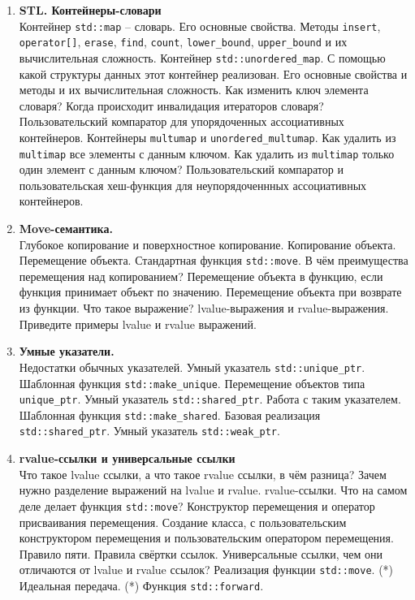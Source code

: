 \documentclass{article}
\begin{document}
\begin{enumerate}
\item \textbf{STL. Контейнеры-словари}\\
Контейнер \texttt{std::map} -- словарь. Его основные свойства. Методы \texttt{insert}, \texttt{operator[]}, \texttt{erase}, \texttt{find}, \texttt{count}, \texttt{lower\_bound}, \texttt{upper\_bound} и их вычислительная сложность. Контейнер \texttt{std::unordered\_map}. С помощью какой структуры данных этот контейнер реализован. Его основные свойства и методы и их вычислительная сложность. Как изменить ключ элемента словаря?  Когда происходит инвалидация итераторов словаря? Пользовательский компаратор для упорядоченных ассоциативных контейнеров. Контейнеры \texttt{multumap} и \texttt{unordered\_multumap}. Как удалить из \texttt{multimap} все элементы с данным ключом. Как удалить из \texttt{multimap} только один элемент с данным ключом? Пользовательский компаратор и пользовательская хеш-функция для неупорядоченнных ассоциативных контейнеров.




\item \textbf{Move-семантика.}\\
Глубокое копирование и поверхностное копирование. Копирование объекта. Перемещение объекта. Стандартная функция \texttt{std::move}. В чём преимущества перемещения над копированием? Перемещение объекта в функцию, если функция принимает объект по значению. Перемещение объекта при возврате из функции. Что такое выражение? lvalue-выражения и rvalue-выражения. Приведите примеры lvalue и rvalue выражений. 

\item \textbf{Умные указатели.}\\
Недостатки обычных указателей. Умный указатель \texttt{std::unique\_ptr}. Шаблонная функция \texttt{std::make\_unique}. Перемещение объектов типа \texttt{unique\_ptr}. Умный указатель \texttt{std::shared\_ptr}. Работа с таким указателем. Шаблонная функция \texttt{std::make\_shared}. Базовая реализация \texttt{std::shared\_ptr}. Умный указатель \texttt{std::weak\_ptr}.


\item \textbf{rvalue-ссылки и универсальные ссылки}\\
Что такое lvalue ссылки, а что такое rvalue ссылки, в чём разница? Зачем нужно разделение выражений на lvalue и rvalue. rvalue-ссылки. Что на самом деле делает функция \texttt{std::move}? Конструктор перемещения и оператор присваивания перемещения. Создание класса, с пользовательским конструктором перемещения и пользовательским оператором перемещения. Правило пяти.  Правила свёртки ссылок. Универсальные ссылки, чем они отличаются от lvalue и rvalue ссылок? Реализация функции \texttt{std::move}. (*) Идеальная передача. (*) Функция \texttt{std::forward}.




\end{enumerate}
\end{document}
